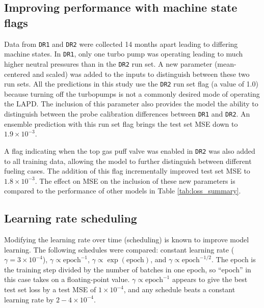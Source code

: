 \subsection{Improving performance with machine state flags}

Data from \texttt{DR1} and \texttt{DR2} were collected 14 months apart leading to differing machine states. In \texttt{DR1}, only one turbo pump was operating leading to much higher neutral pressures than in the \texttt{DR2} run set. A new parameter (mean-centered and scaled) was added to the inputs to distinguish between these two run sets. All the predictions in this study use the \texttt{DR2} run set flag (a value of 1.0) because turning off the turbopumps is not a commonly desired mode of operating the LAPD. The inclusion of this parameter also provides the model the ability to distinguish between the probe calibration differences between \texttt{DR1} and \texttt{DR2}. An ensemble prediction with this run set flag brings the test set MSE down to $1.9 \times 10^{-3}$.  

A flag indicating when the top gas puff valve was enabled in \texttt{DR2} was also added to all training data, allowing the model to further distinguish between different fueling cases. The addition of this flag incrementally improved test set MSE to $1.8 \times 10^{-3}$. The effect on MSE on the inclusion of these new parameters is compared to the performance of other models in Table \ref{tab:loss_summary}. 

\subsection{Learning rate scheduling}
Modifying the learning rate over time (scheduling) is known to improve model learning. The following schedules were compared: constant learning rate ($\gamma = 3 \times 10^{-4}$), $\gamma \propto \text{epoch}^{-1}$, $\gamma \propto \exp{(\text{epoch})}$, and $\gamma \propto \text{epoch}^{-1/2}$. The epoch is the training step divided by the number of batches in one epoch, so ``epoch'' in this case takes on a floating-point value. $\gamma \propto \text{epoch}^{-1}$ appears to give the best test set loss by a test MSE of $1 \times 10^{-4}$, and any schedule beats a constant learning rate by $2-4 \times 10^{-4}$. 


